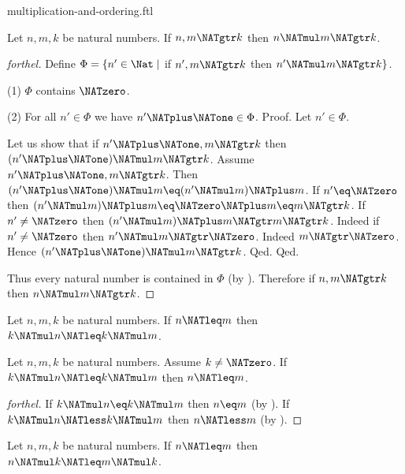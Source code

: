 \documentclass{naproche-library}
\begin{document}
\begin{smodule}[title=Multiplication and Ordering]{multiplication-and-ordering.ftl}
\begin{proposition}[forthel,id=ARITHMETIC_06_1826268599287808]
  Let $n, m, k$ be natural numbers.
  If $n, m \NATgtr k$ then $n \NATmul m \NATgtr k$.
\end{proposition}
\begin{proof}[forthel]
  Define $\Phi = \{ n' \in \Nat \mid$ if $n', m \NATgtr k$ then $n' \NATmul m \NATgtr k \}$.

  (1) $\Phi$ contains $\NATzero$.

  (2) For all $n' \in \Phi$ we have $n' \NATplus \NATone \in \Phi$. \newline
  Proof.
    Let $n' \in \Phi$.

    Let us show that if $n' \NATplus \NATone, m \NATgtr k$ then $(n' \NATplus \NATone) \NATmul m \NATgtr k$.
      Assume $n' \NATplus \NATone, m \NATgtr k$.
      Then $(n' \NATplus \NATone) \NATmul m \eq (n' \NATmul m) \NATplus m$.
      If $n' \eq \NATzero$ then
      $(n' \NATmul m) \NATplus m
        \eq \NATzero \NATplus m
        \eq m
        \NATgtr k$.
      If $n' \neq \NATzero$ then
      $(n' \NATmul m) \NATplus m
        \NATgtr m
        \NATgtr k$.
      Indeed if $n' \neq \NATzero$ then $n' \NATmul m \NATgtr \NATzero$.
      Indeed $m \NATgtr \NATzero$.
      Hence $(n' \NATplus \NATone) \NATmul m \NATgtr k$.
    Qed.
  Qed.

  Thus every natural number is contained in $\Phi$ (by ).
  Therefore if $n, m \NATgtr k$ then $n \NATmul m \NATgtr k$.
\end{proof}

\begin{corollary}[forthel,id=ARITHMETIC_06_1751605544222720]
  Let $n, m, k$ be natural numbers.
  If $n \NATleq m$ then $k \NATmul n \NATleq k \NATmul m$.
\end{corollary}

\begin{corollary}[forthel,id=ARITHMETIC_06_3965209318260736]
  Let $n, m, k$ be natural numbers.
  Assume $k \neq \NATzero$.
  If $k \NATmul n \NATleq k \NATmul m$ then $n \NATleq m$.
\end{corollary}
\begin{proof}[forthel]
  If $k \NATmul n \eq k \NATmul m$ then $n \eq m$ (by ).
  If $k \NATmul n \NATless k \NATmul m$ then $n \NATless m$ (by ).
\end{proof}

\begin{corollary}[forthel,id=ARITHMETIC_06_8946886668976128]
  Let $n, m, k$ be natural numbers.
  If $n \NATleq m$ then $n \NATmul k \NATleq m \NATmul k$.
\end{corollary}


\end{smodule}
\end{document}
